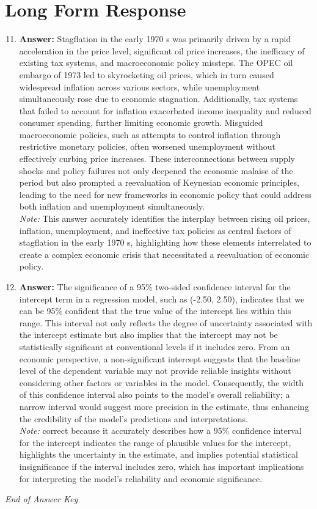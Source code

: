 \documentclass[12pt]{article}
\begin{document}
\section*{Long Form Response}
\begin{enumerate}[label=\arabic*.]
\setcounter{enumi}{10}
\item \textbf{Answer:} Stagflation in the early 1970 s was primarily driven by a rapid acceleration in the price level, significant oil price increases, the inefficacy of existing tax systems, and macroeconomic policy missteps. The OPEC oil embargo of 1973 led to skyrocketing oil prices, which in turn caused widespread inflation across various sectors, while unemployment simultaneously rose due to economic stagnation. Additionally, tax systems that failed to account for inflation exacerbated income inequality and reduced consumer spending, further limiting economic growth. Misguided macroeconomic policies, such as attempts to control inflation through restrictive monetary policies, often worsened unemployment without effectively curbing price increases. These interconnections between supply shocks and policy failures not only deepened the economic malaise of the period but also prompted a reevaluation of Keynesian economic principles, leading to the need for new frameworks in economic policy that could address both inflation and unemployment simultaneously.
\\ \textit{Note:} This answer accurately identifies the interplay between rising oil prices, inflation, unemployment, and ineffective tax policies as central factors of stagflation in the early 1970 s, highlighting how these elements interrelated to create a complex economic crisis that necessitated a reevaluation of economic policy.
\item \textbf{Answer:} The significance of a 95\% two-sided confidence interval for the intercept term in a regression model, such as (-2.50, 2.50), indicates that we can be 95\% confident that the true value of the intercept lies within this range. This interval not only reflects the degree of uncertainty associated with the intercept estimate but also implies that the intercept may not be statistically significant at conventional levels if it includes zero. From an economic perspective, a non-significant intercept suggests that the baseline level of the dependent variable may not provide reliable insights without considering other factors or variables in the model. Consequently, the width of this confidence interval also points to the model's overall reliability; a narrow interval would suggest more precision in the estimate, thus enhancing the credibility of the model's predictions and interpretations.
\\ \textit{Note:} correct because it accurately describes how a 95\% confidence interval for the intercept indicates the range of plausible values for the intercept, highlights the uncertainty in the estimate, and implies potential statistical insignificance if the interval includes zero, which has important implications for interpreting the model's reliability and economic significance.
\end{enumerate}

\vfill
\noindent\textit{End of Answer Key}
\end{document}
